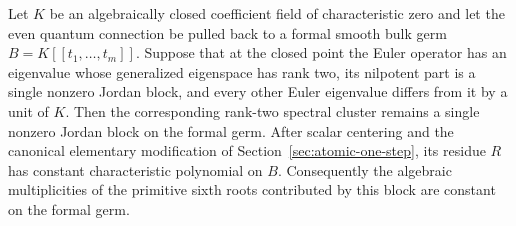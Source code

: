 \begin{proposition}
\label{prop:ranktwo-framed-germ}
%
%
Let $K$ be an algebraically closed coefficient field of characteristic zero
and let the even quantum connection be pulled back to a formal smooth bulk
germ $B=K[[t_1,\ldots,t_m]]$.  Suppose that at the closed point the Euler
operator has an eigenvalue whose generalized eigenspace has rank two, its
nilpotent part is a single nonzero Jordan block, and every other Euler
eigenvalue differs from it by a unit of $K$.  Then the corresponding
rank-two spectral cluster remains a single nonzero Jordan block on the
formal germ.  After scalar centering and the canonical elementary
modification of Section~\ref{sec:atomic-one-step}, its residue $R$ has
constant characteristic polynomial on $B$.  Consequently the algebraic
multiplicities of the primitive sixth roots contributed by this block are
constant on the formal germ.
\end{proposition}

